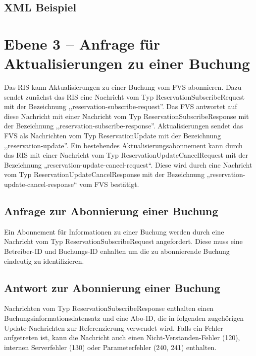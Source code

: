 

\subsection{XML Beispiel}

\section{Ebene 3 -- Anfrage für Aktualisierungen zu einer Buchung}
Das RIS kann Aktualisierungen zu einer Buchung vom FVS abonnieren. Dazu sendet zunächst das RIS eine Nachricht vom Typ ReservationSubscribeRequest mit der Bezeichnung ,,reservation-subscribe-request''. Das FVS antwortet auf diese Nachricht mit einer Nachricht vom Typ ReservationSubscribeResponse mit der Bezeichnung ,,reservation-subscribe-response''. Aktualisierungen sendet das FVS als Nachrichten vom Typ ReservationUpdate mit der Bezeichnung ,,reservation-update''. Ein bestehendes Aktualisierungsabonnement kann durch das RIS mit einer Nachricht vom Typ ReservationUpdateCancelRequest mit der Bezeichnung „reservation-update-cancel-request“. Diese wird durch eine Nachricht vom Typ ReservationUpdateCancelResponse mit der Bezeichnung „reservation-update-cancel-response“ vom FVS bestätigt.



\subsection{Anfrage zur Abonnierung einer Buchung}
Ein Abonnement für Informationen zu einer Buchung werden durch eine Nachricht vom Typ ReservationSubscribeRequest angefordert. Diese muss eine Betreiber-ID und Buchungs-ID enhalten um die zu abonnierende Buchung eindeutig zu identifizieren.



\subsection{Antwort zur Abonnierung einer Buchung}
Nachrichten vom Typ ReservationSubscribeResponse enthalten einen Buchungsinformationsdatensatz und eine Abo-ID, die in folgenden zugehörigen Update-Nachrichten zur Referenzierung verwendet wird. Falls ein Fehler aufgetreten ist, kann die Nachricht auch einen Nicht-Verstanden-Fehler (120), internen Serverfehler (130) oder Parameterfehler (240, 241) enthalten.

